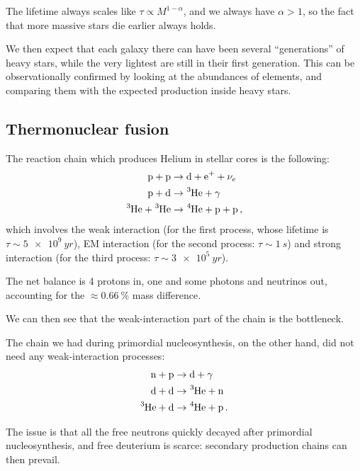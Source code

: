 \documentclass[main.tex]{subfiles}
\begin{document}
The lifetime always scales like \(\tau \propto M^{1 -\alpha }\), and we always have \(\alpha >1\), so the fact that more massive stars die earlier always holds.

We then expect that each galaxy there can have been several ``generations'' of heavy stars, while the very lightest are still in their first generation. This can be observationally confirmed by looking at the abundances of elements, and comparing them with the expected production inside heavy stars. 

\subsection{Thermonuclear fusion}

The reaction chain which produces Helium in stellar cores is the following:
%
\begin{subequations}
\begin{align}
  \ce{p + p} &\rightarrow \ce{d + e+ +} \nu_e  \\
  \ce{p + d} &\rightarrow \ce{^3He} + \gamma  \\
  \ce{^3He + ^3He} &\rightarrow \ce{^4He + p + p} 
\,,
\end{align}
\end{subequations}
%
which involves the weak interaction (for the first process, whose lifetime is \(\tau \sim \SI{5e9}{yr}\)), EM interaction (for the second process: \(\tau \sim \SI{1}{s}\)) and strong interaction (for the third process: \(\tau \sim  \SI{3e5}{yr}\)).

The net balance is 4 protons in, one  and some photons and neutrinos out, accounting for the \(\approx \SI{0.66}{\percent}\) mass difference. 

We can then see that the weak-interaction part of the chain is the bottleneck.

The chain we had during primordial nucleosynthesis, on the other hand, did not need any weak-interaction processes:
%
\begin{subequations}
\begin{align}
  \ce{n + p} &\rightarrow \ce{d} + \gamma   \\
  \ce{d + d} &\rightarrow \ce{^3He + n}  \\
  \ce{^3He + d}  &\rightarrow \ce{^4He + p}
\,.
\end{align}
\end{subequations}

The issue is that all the free neutrons quickly decayed after primordial nucleosynthesis, and free deuterium is scarce: secondary production chains can then prevail. 

\end{document}
